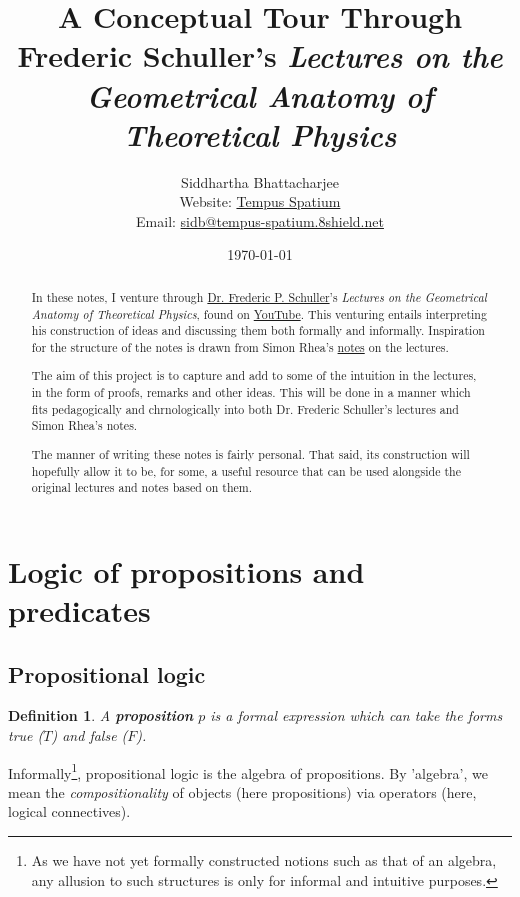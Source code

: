 \documentclass[12pt]{article}
\title{A Conceptual Tour Through Frederic Schuller's \emph{Lectures on the Geometrical Anatomy of Theoretical Physics}}
\author{Siddhartha Bhattacharjee \\
Website: \href{https://booodaness.github.io/tempus-spatium/}{Tempus Spatium} \\
Email: \href{javascript:location.href = 'mailto:' + ['sidb','tempus-spatium.8shield.net'].join('@')}{sidb@tempus-spatium.8shield.net}
}
\affil{Student, B.Sc. (Hons) Mathematical Physics, University of Waterloo}
\date{\today}
\newtheorem{definition}{Definition}[section]
\begin{document}
\maketitle

\begin{abstract}
In these notes, I venture through \href{https://people.utwente.nl/f.p.schuller}{Dr. Frederic P. Schuller}'s \emph{Lectures on the Geometrical Anatomy of Theoretical Physics}, found on \href{https://youtube.com/playlist?list=PLPH7f_7ZlzxTi6kS4vCmv4ZKm9u8g5yic}{YouTube}. This venturing entails interpreting his construction of ideas and discussing them both formally and informally. Inspiration for the structure of the notes is drawn from Simon Rhea's \href{https://mathswithphysics.blogspot.com/2016/07/lectures-on-geometric-anatomy-of.html}{notes} on the lectures.

The aim of this project is to capture and add to some of the intuition in the lectures, in the form of proofs, remarks and other ideas. This will be done in a manner which fits pedagogically and chrnologically into both Dr. Frederic Schuller's lectures and Simon Rhea's notes.

The manner of writing these notes is fairly personal. That said, its construction will hopefully allow it to be, for some, a useful resource that can be used alongside the original lectures and notes based on them.
\end{abstract}

\tableofcontents

\section{Logic of propositions and predicates}

\subsection{Propositional logic}

\begin{shaded}
\begin{definition}
A \textbf{proposition} $p$ is a formal expression which can take the forms \emph{true} ($T$) and \emph{false} ($F$).
\end{definition}
\end{shaded}

Informally\footnote{As we have not yet formally constructed notions such as that of an algebra, any allusion to such structures is only for informal and intuitive purposes.}, propositional logic is the algebra of propositions. By 'algebra', we mean the \emph{compositionality} of objects (here propositions) via operators (here, logical connectives).
\end{document}
